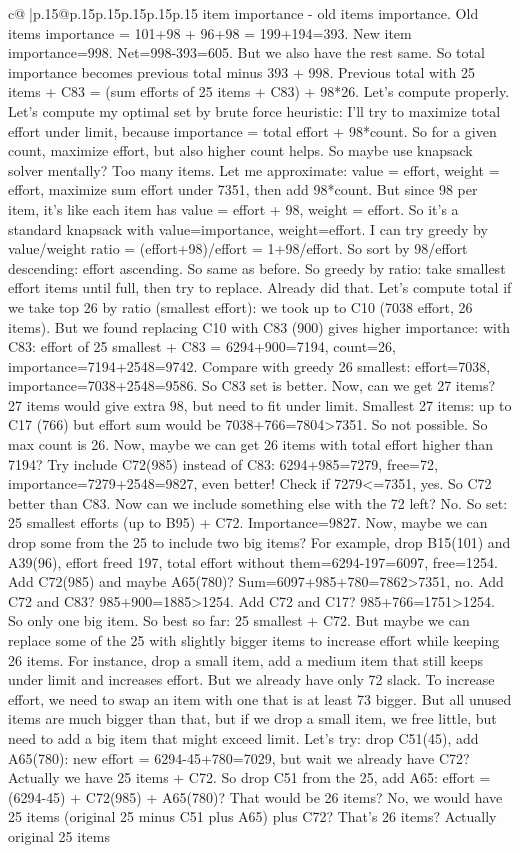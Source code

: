 \documentclass{article}
\begin{document}
{\begin{supertabular}{c@{$\;$}|p{.15\linewidth}@{}p{.15\linewidth}p{.15\linewidth}p{.15\linewidth}p{.15\linewidth}p{.15\linewidth}}
{{{item importance {-} old items importance. Old items importance = 101+98 + 96+98 = 199+194=393. New item importance=998. Net=998{-}393=605. But we also have the rest same. So total importance becomes previous total minus 393 + 998. Previous total with 25 items + C83 = (sum efforts of 25 items + C83) + 98*26. Let’s compute properly. Let’s compute my optimal set by brute force heuristic: I’ll try to maximize total effort under limit, because importance = total effort + 98*count. So for a given count, maximize effort, but also higher count helps. So maybe use knapsack solver mentally? Too many items. Let me approximate: value = effort, weight = effort, maximize sum effort under 7351, then add 98*count. But since 98 per item, it’s like each item has value = effort + 98, weight = effort. So it’s a standard knapsack with value=importance, weight=effort. I can try greedy by value/weight ratio = (effort+98)/effort = 1+98/effort. So sort by 98/effort descending: effort ascending. So same as before. So greedy by ratio: take smallest effort items until full, then try to replace. Already did that. Let’s compute total if we take top 26 by ratio (smallest effort): we took up to C10 (7038 effort, 26 items). But we found replacing C10 with C83 (900) gives higher importance: with C83: effort of 25 smallest + C83 = 6294+900=7194, count=26, importance=7194+2548=9742. Compare with greedy 26 smallest: effort=7038, importance=7038+2548=9586. So C83 set is better. Now, can we get 27 items? 27 items would give extra 98, but need to fit under limit. Smallest 27 items: up to C17 (766) but effort sum would be 7038+766=7804>7351. So not possible. So max count is 26. Now, maybe we can get 26 items with total effort higher than 7194? Try include C72(985) instead of C83: 6294+985=7279, free=72, importance=7279+2548=9827, even better! Check if 7279<=7351, yes. So C72 better than C83. Now can we include something else with the 72 left? No. So set: 25 smallest efforts (up to B95) + C72. Importance=9827. Now, maybe we can drop some from the 25 to include two big items? For example, drop B15(101) and A39(96), effort freed 197, total effort without them=6294{-}197=6097, free=1254. Add C72(985) and maybe A65(780)? Sum=6097+985+780=7862>7351, no. Add C72 and C83? 985+900=1885>1254. Add C72 and C17? 985+766=1751>1254. So only one big item. So best so far: 25 smallest + C72. But maybe we can replace some of the 25 with slightly bigger items to increase effort while keeping 26 items. For instance, drop a small item, add a medium item that still keeps under limit and increases effort. But we already have only 72 slack. To increase effort, we need to swap an item with one that is at least 73 bigger. But all unused items are much bigger than that, but if we drop a small item, we free little, but need to add a big item that might exceed limit. Let’s try: drop C51(45), add A65(780): new effort = 6294{-}45+780=7029, but wait we already have C72? Actually we have 25 items + C72. So drop C51 from the 25, add A65: effort = (6294{-}45) + C72(985) + A65(780)? That would be 26 items? No, we would have 25 items (original 25 minus C51 plus A65) plus C72? That’s 26 items? Actually original 25 items }}}
\end{supertabular}}
\end{document}
